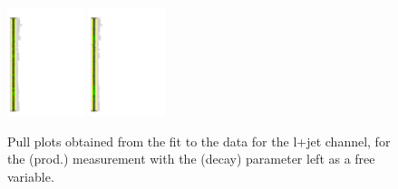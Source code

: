 \begin{figure}[ht]
  \centering
  \includegraphics[width=0.20\textwidth]{figures/diff_xsec/ljet_tty_prod_mu_blinded/compare_NP_pulls/compare_NP_dilep_fits_pt_ptj1_eta/NuisPar_comp.pdf}
  \quad \quad
  \includegraphics[width=0.20\textwidth]{figures/diff_xsec/ljet_tty_prod_mu_blinded/compare_NP_pulls/compare_NP_dilep_fits_drphb_drlj_dr/NuisPar_comp.pdf}
  \caption{Pull plots obtained from the fit to the data for the l+jet channel, for the \tty (prod.) measurement 
  with the \tty (decay) parameter left as a free variable.}
  \label{fig:pull_plot_pt_tty_dec_free_ljet_mu_blinded}
\end{figure}
\FloatBarrier



